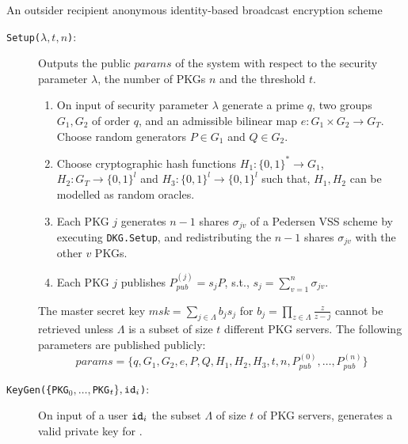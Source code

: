 \begin{algorithm}[H]
\caption{An outsider recipient anonymous identity-based broadcast encryption scheme}
\label{alg:our_scheme}

\begin{description}
    \item[\texttt{Setup($\lambda, t, n$)}:] Outputs the public $params$ of the system with respect to the security parameter $\lambda$, the number of PKGs $n$ and the threshold $t$.
    \begin{enumerate}
        \item On input of security parameter $\lambda$ generate a prime $q$, two groups $G_1, G_2$ of order $q$, and an admissible bilinear map $e: G_1 \times G_2 \rightarrow G_T$. Choose random generators $P \in G_1$ and $Q \in G_2$. 
    
        \item Choose cryptographic hash functions $H_1: \{ 0,1 \}^{*} \rightarrow G_1$, ${H_2: G_T \rightarrow \{ 0,1 \}^{l}}$ and $H_3: \{ 0, 1 \}^{l} \rightarrow \{ 0,1 \}^{l}$ such that, $H_1, H_2$ can be modelled as random oracles.
        
        \item Each PKG $j$ generates $n-1$ shares $\sigma_{jv}$ of a Pedersen VSS scheme by executing \texttt{DKG.Setup}, and redistributing the $n-1$ shares $\sigma_{jv}$ with the other $v$ PKGs.

        \item Each PKG $j$ publishes $P_{pub}^{(j)} = s_j P$, s.t., $s_j=\sum_{v=1}^n \sigma_{jv}$.
    \end{enumerate}
    
    The master secret key $msk = \sum_{j \in \Lambda} b_j s_j$ for $b_j = \prod_{z \in \Lambda} \frac{z}{z-j}$ cannot be retrieved unless $\Lambda$ is a subset of size $t$ different PKG servers. The following parameters are published publicly:
    \begin{equation*}
    params = \{ q, G_1, G_2, e, P, Q, H_1, H_2, H_3, t, n, P_{pub}^{(0)}, \ldots, P_{pub}^{(n)} \}
    \end{equation*}

    \item[\texttt{KeyGen(\{PKG$_0,\ldots,$PKG$_t\}, \mathtt{id}_{i}$)}:] On input of a user $\mathtt{id}_{i}$ the subset $\Lambda$ of size $t$ of PKG servers, generates a valid private key for . 
    

\end{description}
\end{algorithm}
